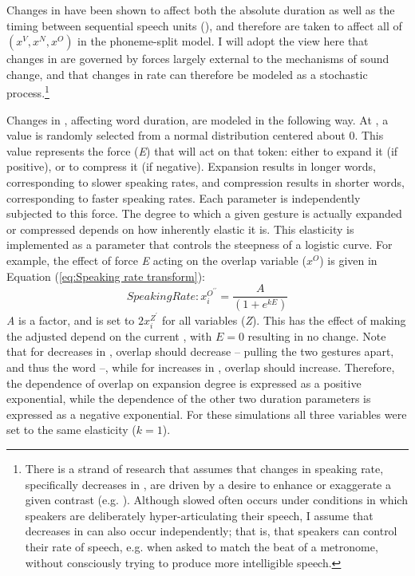 Changes in  have been shown to affect both the absolute
duration as well as the timing between sequential speech units (\citealt{stetson1928motor,Hardcastle1985}),
and therefore are taken to affect all of $(x^{V},x^{N},x^{O})$ in
the phoneme-split model. I will adopt the view here that changes in
 are governed by forces largely external to the mechanisms
of sound change, and that changes in rate can therefore be modeled
as a stochastic process.\footnote{There is a strand of research that assumes that changes in speaking
rate, specifically decreases in , are driven by a desire
to enhance or exaggerate a given  contrast (e.g. \citealt{beckman2011rate}).
Although slowed  often occurs under conditions in which
speakers are deliberately hyper-articulating their speech, I assume
that decreases in  can also occur independently; that
is, that speakers can control their rate of speech, e.g. when asked
to match the beat of a metronome, without consciously trying to produce
more intelligible speech.}

Changes in , affecting word duration, are modeled in
the following way. At , a value is randomly selected from
a normal distribution centered about 0. This value represents the
force (\emph{E}) that will act on that token: either to expand it
(if positive), or to compress it (if negative). Expansion results
in longer words, corresponding to slower speaking rates, and compression
results in shorter words, corresponding to faster speaking rates.
Each  parameter is independently subjected to this force.
The degree to which a given gesture is actually expanded or compressed
depends on how inherently elastic it is. This elasticity is implemented
as a parameter that controls the steepness of a logistic curve. For
example, the effect of force \emph{E} acting on the overlap variable
($x^{O}$) is given in Equation (\ref{eq:Speaking rate transform}): 
\begin{equation}
\textit{SpeakingRate}:x_{i}^{O^{\prime\prime}}=\frac{A}{(1+e^{kE})}\label{eq:Speaking rate transform}
\end{equation}
\emph{A} is a  factor, and is set to $2x_{i}^{Z^{\prime}}$
for all variables (\emph{Z}). This has the effect of making the adjusted
 depend on the current , with $E=0$ resulting in no change.
Note that for decreases in , overlap should decrease
– pulling the two gestures apart, and thus  the word –, while for increases in , overlap should increase. Therefore,
the dependence of overlap on expansion degree is expressed as a positive
exponential, while the dependence of the other two duration parameters
is expressed as a negative exponential. For these simulations all
three  variables were set to the same elasticity ($k=1$). 

